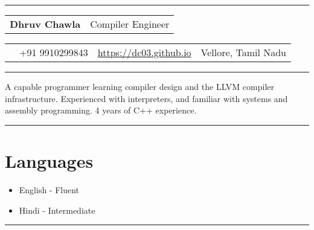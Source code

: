 \documentclass[12pt]{article}
\newcommand{\primarycolor}{red}
\newcommand{\mysection}[1]{\section{#1}\vspace{-1.2ex}}
\newcommand{\myhrule}[1]{
\vspace{1ex}
\hrule
\vspace{#1}
}
\begin{document}
    \hrule
    \vspace{2ex}

    \begin{center}
        \begin{tabularx}{\textwidth}{>{\raggedright\arraybackslash}X
                                     r}
            \textbf{\Huge{Dhruv Chawla}} \vspace{1ex} &
            {\LARGE{\color{\primarycolor}Compiler Engineer}} \\
        \end{tabularx}

        \vspace{1ex}
        \begin{tabularx}{\textwidth}{>{\raggedright\arraybackslash}X
                         p{}
                         c
                         >{\raggedleft\arraybackslash}X}
            {\href{mailto:dhruv263.dc@gmail.com}{dhruv263.dc@gmail.com}} &
            {+91 9910299843} &
            {\url{https://dc03.github.io}} &
            {Vellore, Tamil Nadu} \\
        \end{tabularx}
    \end{center}

    \vspace{-1.2ex}
    \myhrule{2ex}
    {
        \noindent A capable programmer learning compiler design and the LLVM compiler infrastructure. Experienced with interpreters, and familiar with systems and assembly programming. 4 years of C++ experience.
    }
    \vspace{0.8ex}
    \myhrule{2ex}

    \mysection{Languages}
    {
        \vspace{-4ex}
        \begin{itemize}[leftmargin=20ex,itemsep=0ex]
            \item English - Fluent
            \item Hindi - Intermediate
        \end{itemize}
        \vspace{-1.5ex}
    }
    \myhrule{2ex}
\end{document}
